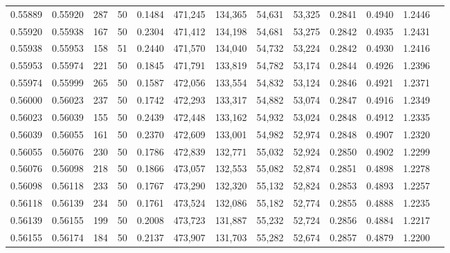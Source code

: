 \begin{tabular}{rrrrrrrrrrrrr}
0.55889 & 0.55920 &   287 &  50 &                                     0.1484 & 471,245 & 134,365 &  54,631 &  53,325 & 0.2841 & 0.4940 & 1.2446 \\
0.55920 & 0.55938 &   167 &  50 &                                     0.2304 & 471,412 & 134,198 &  54,681 &  53,275 & 0.2842 & 0.4935 & 1.2431 \\
0.55938 & 0.55953 &   158 &  51 &                                     0.2440 & 471,570 & 134,040 &  54,732 &  53,224 & 0.2842 & 0.4930 & 1.2416 \\
0.55953 & 0.55974 &   221 &  50 &                                     0.1845 & 471,791 & 133,819 &  54,782 &  53,174 & 0.2844 & 0.4926 & 1.2396 \\
0.55974 & 0.55999 &   265 &  50 &                                     0.1587 & 472,056 & 133,554 &  54,832 &  53,124 & 0.2846 & 0.4921 & 1.2371 \\
0.56000 & 0.56023 &   237 &  50 &                                     0.1742 & 472,293 & 133,317 &  54,882 &  53,074 & 0.2847 & 0.4916 & 1.2349 \\
0.56023 & 0.56039 &   155 &  50 &                                     0.2439 & 472,448 & 133,162 &  54,932 &  53,024 & 0.2848 & 0.4912 & 1.2335 \\
0.56039 & 0.56055 &   161 &  50 &                                     0.2370 & 472,609 & 133,001 &  54,982 &  52,974 & 0.2848 & 0.4907 & 1.2320 \\
0.56055 & 0.56076 &   230 &  50 &                                     0.1786 & 472,839 & 132,771 &  55,032 &  52,924 & 0.2850 & 0.4902 & 1.2299 \\
0.56076 & 0.56098 &   218 &  50 &                                     0.1866 & 473,057 & 132,553 &  55,082 &  52,874 & 0.2851 & 0.4898 & 1.2278 \\
0.56098 & 0.56118 &   233 &  50 &                                     0.1767 & 473,290 & 132,320 &  55,132 &  52,824 & 0.2853 & 0.4893 & 1.2257 \\
0.56118 & 0.56139 &   234 &  50 &                                     0.1761 & 473,524 & 132,086 &  55,182 &  52,774 & 0.2855 & 0.4888 & 1.2235 \\
0.56139 & 0.56155 &   199 &  50 &                                     0.2008 & 473,723 & 131,887 &  55,232 &  52,724 & 0.2856 & 0.4884 & 1.2217 \\
0.56155 & 0.56174 &   184 &  50 &                                     0.2137 & 473,907 & 131,703 &  55,282 &  52,674 & 0.2857 & 0.4879 & 1.2200 \\

\end{tabular}
